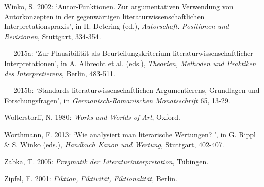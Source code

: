 \begin{hangparas}{.5cm}{1}
Winko, S. 2002: `Autor-Funktionen. Zur argumentativen Verwendung von Autorkonzepten in der gegenw\"artigen literaturwissenschaftlichen Interpretationspraxis', in H. Detering (ed.), \emph{Autorschaft. Positionen und Revisionen}, Stuttgart, 334-354.

--- 2015a: `Zur Plausibilit\"at als Beurteilungskriterium literaturwissenschaftlicher Interpretationen', in A. Albrecht et al. (eds.), \emph{Theorien, Methoden und Praktiken des Interpretierens}, Berlin, 483-511.

--- 2015b: `Standards literaturwissenschaftlichen Argumentierens, Grundlagen und Forschungsfragen', in \emph{Germanisch-Romanischen Monatsschrift} 65, 13-29.

Wolterstorff, N. 1980: \emph{Works and Worlds of Art}, Oxford.

Worthmann, F. 2013: `Wie analysiert man literarische Wertungen? ', in G. Rippl \& S. Winko (eds.), \emph{Handbuch Kanon und Wertung}, Stuttgart, 402-407.

Zabka, T. 2005: \emph{Pragmatik der Literaturinterpretation}, T\"ubingen.

Zipfel, F. 2001: \emph{Fiktion, Fiktivit\"at, Fiktionalit\"at}, Berlin.

\end{hangparas}
